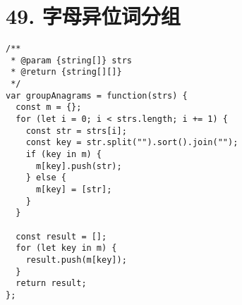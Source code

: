 \newpage
\section{49. 字母异位词分组}
\label{leetcode:49}

\begin{verbatim}
/**
 * @param {string[]} strs
 * @return {string[][]}
 */
var groupAnagrams = function(strs) {
  const m = {};
  for (let i = 0; i < strs.length; i += 1) {
    const str = strs[i];
    const key = str.split("").sort().join("");
    if (key in m) {
      m[key].push(str);
    } else {
      m[key] = [str];
    }
  }

  const result = [];
  for (let key in m) {
    result.push(m[key]);
  }
  return result;
};
\end{verbatim}